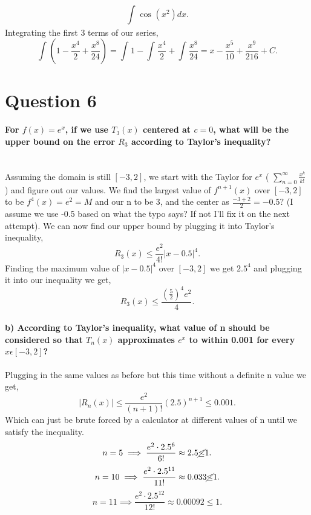 \documentclass{report}
\begin{document}
\[
\int_{  }^{  } \cos^{  } \left( x^2 \right) dx
.\] 
Integrating the first 3 terms of our series,
\[
\int_{  }^{  } \left( 1- \frac{ x^{ 4 } }{ 2 } + \frac{ x^{ 8 } }{ 24 } \right) = \int_{  }^{  } 1 - \int_{  }^{  } \frac{ x^{ 4 } }{ 2 } + \int_{  }^{  } \frac{ x^{ 8 } }{ 24 } = x - \frac{ x^{ 5 } }{ 10 } + \frac{ x^{ 9 } }{ 216 } + C 
.\] 
\section*{Question 6}%
\label{sec:Question 6}
\paragraph{For $ f\left( x \right) =e^{ x } $, if we use $ T_3\left( x \right)  $ centered at $ c=0 $, what will be the upper bound on the error $ R_3 $ according to Taylor's inequality? \\ \\}
Assuming the domain is still $ \left[ -3,2 \right]  $, we start with the Taylor for $ e^{ x } $ ( $ \sum_{ n=0 } ^{ \infty } \frac{ x^{ k } }{ k! } $ ) and figure out our values. We find the largest value of $ f^{ n+1 }\left( x \right)  $ over $ \left[ -3,2 \right]  $ to be $ f^{ 4 }\left( x \right) = e^2 = M $ and our n to be $ 3 $, and the center as $ \frac{ -3+2 }{ 2 }= -0.5?$ (I assume we use -0.5 based on what the typo says? If not I'll fix it on the next attempt). We can now find our upper bound by plugging it into Taylor's inequality,
\[
R_3\left( x \right) \le \frac{ e^2 }{ 4! } \left| x-0.5 \right|^{ 4 }
.\] 
Finding the maximum value of $ \left| x-0.5 \right|^{ 4 } $ over $ \left[ -3,2 \right]  $ we get $ 2.5^{ 4 } $ and plugging it into our inequality we get,
\[
R_3\left( x \right) \le \frac{ \left( \frac{ 5 }{ 2 }  \right) ^{ 4 }e^2 }{ 4 }
.\]
\paragraph{b) According to Taylor's inequality, what value of n should be considered so that $ T_n\left( x \right)  $ approximates $ e^{ x } $ to within 0.001 for every $ x \epsilon\left[ -3,2 \right]  $?}
Plugging in the same values as before but this time without a definite n value we get,
\[
\left| R_n\left( x \right)  \right|\le \frac{ e^2 }{ \left( n+1 \right) ! }\left( 2.5 \right) ^{ n+1 }\le 0.001
.\] 
Which can just be brute forced by a calculator at different values of n until we satisfy the inequality. 
\[
	n=5 \implies \frac{ e^2\cdot 2.5^{ 6 } }{ 6! } \approx 2.5 \cancel{\le} 1
.\] 
\[
	n=10 \implies \frac{ e^2\cdot 2.5^{ 11 } }{ 11! } \approx 0.033 \cancel{\le} 1
.\] 
\[
n=11 \implies \frac{ e^2\cdot 2.5^{ 12 } }{ 12! } \approx 0.00092 \le 1
.\] 
\newpage
\end{document}
